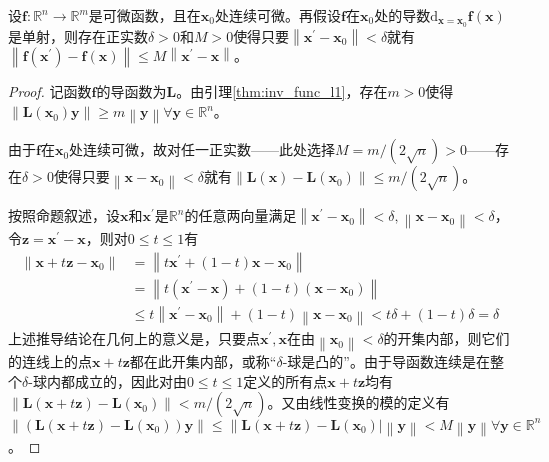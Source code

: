 \documentclass[main.tex]{subfiles}
\begin{document}
\begin{lemma}\label{thm:inv_func_l3}
    设$\mathbf{f}:\mathbb{R}^n\rightarrow\mathbb{R}^m$是可微函数，且在$\mathbf{x}_0$处连续可微。再假设$\mathbf{f}$在$\mathbf{x}_0$处的导数$\mathrm{d}_{\mathbf{x}=\mathbf{x}_0}\mathbf{f}\left(\mathbf{x}\right)$是单射，则存在正实数$\delta>0$和$M>0$使得只要$\left\|\mathbf{x}^\prime-\mathbf{x}_0\right\|<\delta$就有$\left\|\mathbf{f}\left(\mathbf{x}^\prime\right)-\mathbf{f}\left(\mathbf{x}\right)\right\|\leq M\left\|\mathbf{x}^\prime-\mathbf{x}\right\|$。
\end{lemma}
\begin{proof}
    记函数$\mathbf{f}$的导函数为$\mathbf{L}$。由引理\ref{thm:inv_func_l1}，存在$m>0$使得$\left\|\mathbf{L}\left(\mathbf{x}_0\right)\mathbf{y}\right\|\geq m\left\|\mathbf{y}\right\|\forall\mathbf{y}\in\mathbb{R}^n$。

    由于$\mathbf{f}$在$\mathbf{x}_0$处连续可微，故对任一正实数——此处选择$M=m/\left(2\sqrt{n}\right)>0$——存在$\delta>0$使得只要$\left\|\mathbf{x}-\mathbf{x}_0\right\|<\delta$就有$\left\|\mathbf{L}\left(\mathbf{x}\right)-\mathbf{L}\left(\mathbf{x}_0\right)\right\|\leq m/\left(2\sqrt{n}\right)$。

    按照命题叙述，设$\mathbf{x}$和$\mathbf{x}^\prime$是$\mathbb{R}^n$的任意两向量满足$\left\|\mathbf{x}^\prime-\mathbf{x}_0\right\|<\delta,\left\|\mathbf{x}-\mathbf{x}_0\right\|<\delta$，令$\mathbf{z}=\mathbf{x}^\prime-\mathbf{x}$，则对$0\leq t\leq 1$有
    \begin{align*}
        \left\|\mathbf{x}+t\mathbf{z}-\mathbf{x}_0\right\| & =\left\|t\mathbf{x}^\prime+\left(1-t\right)\mathbf{x}-\mathbf{x}_0\right\|                                                                       \\
                                                           & =\left\|t\left(\mathbf{x}^\prime-\mathbf{x}\right)+\left(1-t\right)\left(\mathbf{x}-\mathbf{x}_0\right)\right\|                                  \\
                                                           & \leq t\left\|\mathbf{x}^\prime-\mathbf{x}_0\right\|+\left(1-t\right)\left\|\mathbf{x}-\mathbf{x}_0\right\|<t\delta+\left(1-t\right)\delta=\delta
    \end{align*}
    上述推导结论在几何上的意义是，只要点$\mathbf{x}^\prime,\mathbf{x}$在由$\left\|\mathbf{x}_0\right\|<\delta$的开集内部，则它们的连线上的点$\mathbf{x}+t\mathbf{z}$都在此开集内部，或称“$\delta$-球是凸的”。由于导函数连续是在整个$\delta$-球内都成立的，因此对由$0\leq t\leq 1$定义的所有点$\mathbf{x}+t\mathbf{z}$均有$\left\|\mathbf{L}\left(\mathbf{x}+t\mathbf{z}\right)-\mathbf{L}\left(\mathbf{x}_0\right)\right\|<m/\left(2\sqrt{n}\right)$。又由线性变换的模的定义有$\left\|\left(\mathbf{L}\left(\mathbf{x}+t\mathbf{z}\right)-\mathbf{L}\left(\mathbf{x}_0\right)\right)\mathbf{y}\right\|\leq\left\|\mathbf{L}\left(\mathbf{x}+t\mathbf{z}\right)-\mathbf{L}\left(\mathbf{x}_0\right)\right|\left\|\mathbf{y}\right\|<M\left\|\mathbf{y}\right\|\forall\mathbf{y}\in\mathbb{R}^n$。


\end{proof}
\end{document}
